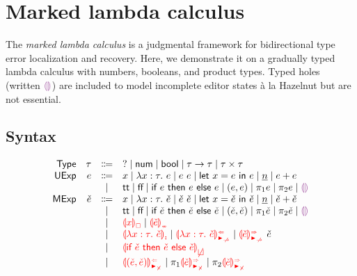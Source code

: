 \documentclass[formalism.tex]{subfiles}
\begin{document}




\section{Marked lambda calculus}
\label{sec:marked}

The \emph{marked lambda calculus} is a judgmental framework for bidirectional type error
localization and recovery. Here, we demonstrate it on a gradually typed lambda calculus with
numbers, booleans, and product types. Typed holes (written $\EEHole$) are included to model
incomplete editor states \`a la Hazelnut but are not essential.

\subsection{Syntax}
\label{sec:marked-syntax}
\[\begin{array}{rrcl}
  \TMName  & \TMV  & \Coloneqq & \TUnknown \mid \TNum \mid \TBool \mid \TArrow{\TMV}{\TMV} \mid \TProd{\TMV}{\TMV} \\
  \EMName  & \EMV  & \Coloneqq & x \mid \ELam{x}{\TMV}{\EMV} \mid \EAp{\EMV}{\EMV} \mid \ELet{x}{\EMV}{\EMV}
                     \mid           \ENumMV \mid \EPlus{\EMV}{\EMV} \\
           &       & \mid         & \ETrue \mid \EFalse \mid \EIf{\EMV}{\EMV}{\EMV}
                     \mid           \EPair{\EMV}{\EMV}
                     \mid           \EProjL{\EMV} \mid \EProjR{\EMV}
                     \mid           \EEHole \\
  \ECMName & \ECMV & \Coloneqq & x \mid \ECLam{x}{\TMV}{\ECMV} \mid \ECAp{\ECMV}{\ECMV} \mid \ECLet{x}{\ECMV}{\ECMV}
                     \mid           \ECNumMV \mid \ECPlus{\ECMV}{\ECMV} \\
           &       & \mid         & \ECTrue \mid \ECFalse \mid \ECIf{\ECMV}{\ECMV}{\ECMV}
                     \mid           \ECPair{\ECMV}{\ECMV} \mid \ECProjL{\ECMV} \mid \ECProjR{\ECMV}
                     \mid           \ECEHole \\
           &       & \mid         & \ECFree{x} \mid \ECInconType{\ECMV} \\
           &       & \mid         & \ECLamInconAsc{x}{\TMV}{\ECMV} \mid \ECLamAnaNonMatchedArrow{x}{\TMV}{\ECMV} \mid \ECApSynNonMatchedArrow{\ECMV}{\ECMV} \\
           &       & \mid         & \ECInconBr{\ECMV}{\ECMV}{\ECMV} \\
           &       & \mid         & \ECPairAnaNonMatchedProd{\ECMV}{\ECMV} \mid \ECProjLSynNonMatchedProd{\ECMV} \mid \ECProjRSynNonMatchedProd{\ECMV}
\end{array}\]
\end{document}
